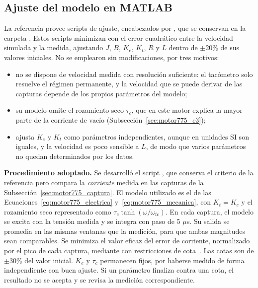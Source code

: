 \subsection{Ajuste del modelo en MATLAB}
\label{sec:motor775_ajuste}
La referencia provee scripts de ajuste, encabezados por , que se conservan en la carpeta . Estos scripts minimizan con  el error cuadrático entre la velocidad simulada y la medida, ajustando $J$, $B$, $K_e$, $K_t$, $R$ y $L$ dentro de $\pm$20\% de sus valores iniciales. No se emplearon sin modificaciones, por tres motivos:
\begin{itemize}
\item no se dispone de velocidad medida con resolución suficiente: el tacómetro solo resuelve el régimen permanente, y la velocidad que se puede derivar de las capturas depende de los propios parámetros del modelo;
\item su modelo omite el rozamiento seco $\tau_c$, que en este motor explica la mayor parte de la corriente de vacío (Subsección~\ref{sec:motor775_e3});
\item ajusta $K_e$ y $K_t$ como parámetros independientes, aunque en unidades SI son iguales, y la velocidad es poco sensible a $L$, de modo que varios parámetros no quedan determinados por los datos.
\end{itemize}

\textbf{Procedimiento adoptado.} Se desarrolló el script , que conserva el criterio de la referencia pero compara la \emph{corriente} medida en las capturas de la Subsección~\ref{sec:motor775_captura}. El modelo utilizado es el de las Ecuaciones~\eqref{eq:motor775_electrica} y~\eqref{eq:motor775_mecanica}, con $K_t = K_e$ y el rozamiento seco representado como $\tau_c\tanh(\omega/\omega_{tc})$. En cada captura, el modelo se excita con la tensión medida y se integra con paso de 5 $\mu$s. Su salida se promedia en las mismas ventanas que la medición, para que ambas magnitudes sean comparables. Se minimiza el valor eficaz del error de corriente, normalizado por el pico de cada captura, mediante  con restricciones de cota~\cite{mathworks_fmincon}. Las cotas son de $\pm$30\% del valor inicial. $K_e$ y $\tau_c$ permanecen fijos, por haberse medido de forma independiente con buen ajuste. Si un parámetro finaliza contra una cota, el resultado no se acepta y se revisa la medición correspondiente.

